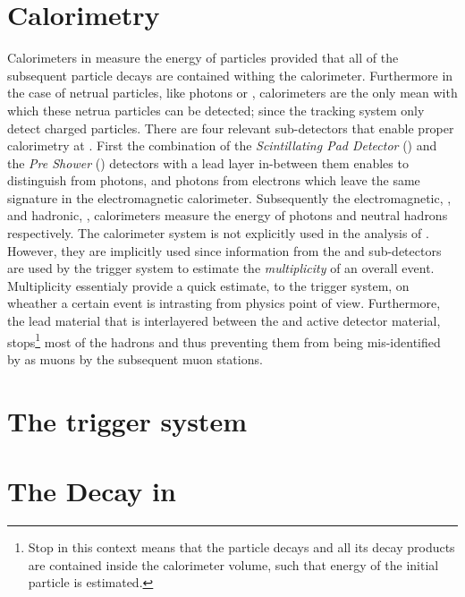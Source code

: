 \section{Calorimetry}
\label{det_calo}
Calorimeters in \lhcb measure the energy of particles provided that all of the subsequent particle decays are
contained withing the calorimeter. Furthermore in the case of netrual particles, like photons or \piz,
calorimeters are the only mean with which these netrua particles can be detected; since the tracking system
only detect charged particles. There are four relevant sub-detectors
that enable proper calorimetry at \lhcb. First the combination of the {\it Scintillating Pad Detector} (\spd)
and the {\it Pre Shower} (\presh) detectors with a lead layer in-between them enables to distinguish \piz from
photons, and photons from electrons which leave the same signature in the electromagnetic calorimeter.
Subsequently the electromagnetic, \ecal, and hadronic, \hcal, calorimeters measure the energy of photons
and neutral hadrons respectively. The calorimeter system is not explicitly used in the analysis of .
However, they are implicitly used since information from the \spd and \presh sub-detectors are used
by the \lzero trigger system to estimate the {\it multiplicity} of an overall event. Multiplicity essentialy
provide a quick estimate, to the \lzero trigger system, on wheather a certain event is intrasting from physics
point of view. Furthermore, the lead material that is interlayered between the \ecal and \hcal active detector material,
stops\footnote{Stop in this context means that the particle decays and all its decay products are contained inside the calorimeter
volume, such that energy of the initial particle is estimated.} most of the hadrons and thus preventing them
from being mis-identified by as muons by the subsequent muon stations.

\section{The trigger system}
\label{det_trigger}


\section{The \BJpsiKst Decay in \lhcb}
\label{BspsiKst_at_lhcb}

